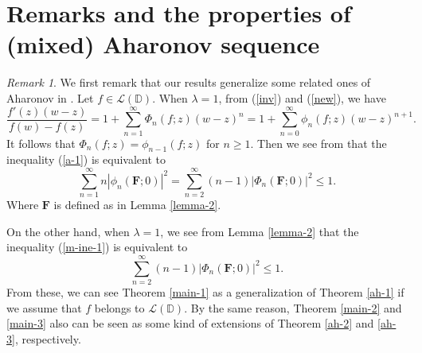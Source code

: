 \documentclass[10pt]{amsart}
\theoremstyle{definition}
\theoremstyle{remark}
\newtheorem{remark}[theorem]{Remark}
\numberwithin{equation}{section}
\begin{document}
\section{\bf{Remarks and the properties of (mixed) Aharonov sequence}}
 \begin{remark}
 We first remark that our results generalize some related ones of Aharonov in \cite{Ah}.  Let $f\in \mathcal{L}(\mathbb{D})$.  When $\lambda=1$, from (\ref{inv}) and (\ref{new}),  we have
 \begin{equation}
\frac{f'(z)(w-z)}{f(w)-f(z)}=1+\sum_{n=1}^{\infty}\Phi_n(f; z)(w-z)^{n}=1+\sum_{n=0}^{\infty}\phi_n(f; z)(w-z)^{n+1}. \nonumber
\end{equation}
It follows that $\Phi_n(f; z)=\phi_{n-1}(f; z)$ for $n\geq 1$.  Then we see from  \cite[Theorem 2]{Ah} that the inequality (\ref{a-1}) is equivalent to 
\begin{equation}
 \sum_{n=1}^{\infty} n|\phi_n(\mathbf{F}; 0)|^2=\sum_{n=2}^{\infty}(n-1)|\Phi_n(\mathbf{F}; 0)|^2  \leq 1. \nonumber
 \end{equation}
Where $\mathbf{F}$ is defined as in Lemma \ref{lemma-2}.

On the other hand,  when $\lambda=1$, we see from Lemma \ref{lemma-2} that the inequality (\ref{m-ine-1}) is equivalent to 
\begin{equation}
 \sum_{n=2}^{\infty}(n-1)|\Phi_n(\mathbf{F}; 0)|^2\leq 1. \nonumber
 \end{equation}
From these, we can see Theorem \ref{main-1} as a generalization of Theorem \ref{ah-1} if we assume that $f$ belongs to $ \mathcal{L}(\mathbb{D})$. By the same reason,  Theorem \ref{main-2} and \ref{main-3} also can be seen as some kind of extensions of Theorem \ref{ah-2} and \ref{ah-3}, respectively. 
\end{remark}
\end{document}
